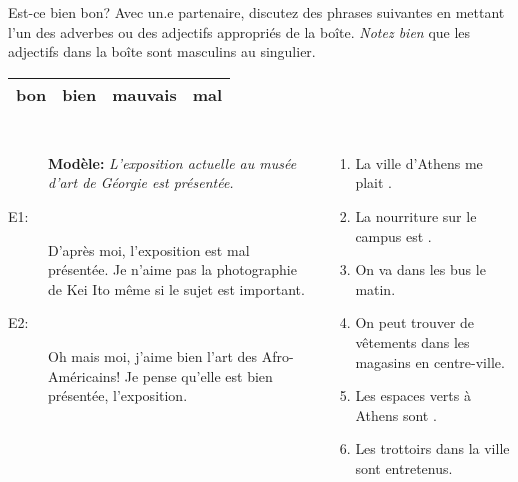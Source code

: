 \begin{frame}{Est-ce bien bon?}
  \small
  Avec un.e partenaire, discutez des phrases suivantes en mettant  l'un des adverbes ou des adjectifs appropriés de la boîte.
  \emph{Notez bien} que les adjectifs dans la boîte sont masculins au singulier.
  \begin{center}
    \begin{tabular}{| l l l l |}
      \hline
      bon & bien & mauvais & mal \\
      \hline
    \end{tabular}
  \end{center}
  \begin{columns}[t]
    \scriptsize
      \begin{description}
        \item[] \textbf{Modèle:} \emph{L'exposition actuelle au musée d'art de Géorgie est \underline{\hspace{1.25cm}} présentée.}
        \item[E1:] D'après moi, l'exposition est \alert{mal} présentée. Je n'aime pas la photographie de Kei Ito même si le sujet est important.
        \item[E2:] Oh mais moi, j'aime bien l'art des Afro-Américains! Je pense qu'elle est \alert{bien} présentée, l'exposition.
      \end{description}
      \begin{enumerate}
        \item La ville d'Athens me plait \underline{\hspace{1.25cm}}.
        \item La nourriture sur le campus est \underline{\hspace{1.25cm}}.
        \item On va \underline{\hspace{1.25cm}} dans les bus le matin.
        \item On peut trouver de \underline{\hspace{1.25cm}} vêtements dans les magasins en centre-ville.
        \item Les espaces verts à Athens sont \underline{\hspace{1.25cm}}.
        \item Les trottoirs dans la ville sont \underline{\hspace{1.25cm}} entretenus.
      \end{enumerate}
  \end{columns}
\end{frame}